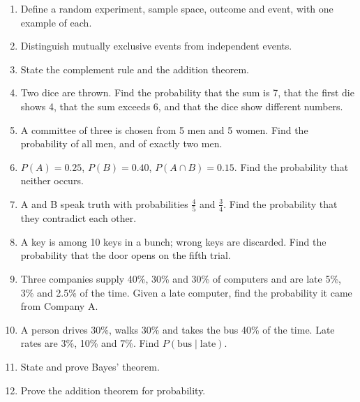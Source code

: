 \documentclass[11pt,a4paper]{article}
\begin{document}
\begin{enumerate}
\item Define a random experiment, sample space, outcome and event, with one example of each.
\item Distinguish mutually exclusive events from independent events.
\item State the complement rule and the addition theorem.
\item Two dice are thrown. Find the probability that the sum is 7, that the first die shows 4, that the sum exceeds 6, and that the dice show different numbers.
\item A committee of three is chosen from 5 men and 5 women. Find the probability of all men, and of exactly two men.
\item $P(A)=0.25$, $P(B)=0.40$, $P(A\cap B)=0.15$. Find the probability that neither occurs.
\item A and B speak truth with probabilities $\frac45$ and $\frac34$. Find the probability that they contradict each other.
\item A key is among 10 keys in a bunch; wrong keys are discarded. Find the probability that the door opens on the fifth trial.
\item Three companies supply 40\%, 30\% and 30\% of computers and are late 5\%, 3\% and 2.5\% of the time. Given a late computer, find the probability it came from Company A.
\item A person drives 30\%, walks 30\% and takes the bus 40\% of the time. Late rates are 3\%, 10\% and 7\%. Find $P(\text{bus}\mid\text{late})$.
\item State and prove Bayes' theorem.
\item Prove the addition theorem for probability.
\end{enumerate}
\end{document}
